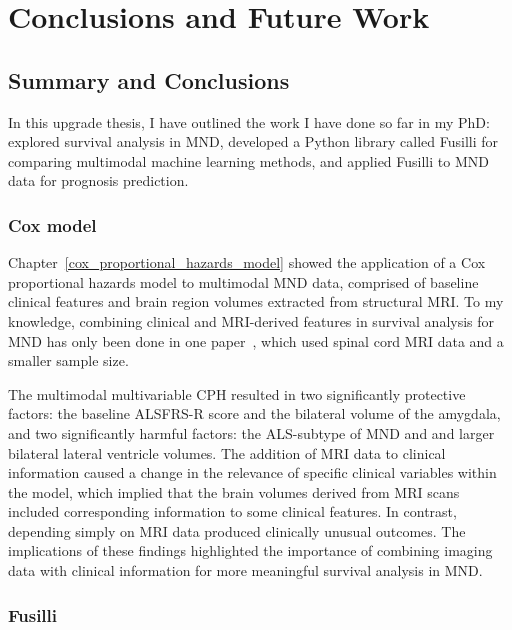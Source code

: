 \chapter{Conclusions and Future Work}
\label{conclusions_and_future_work}

\section{Summary and Conclusions}

In this upgrade thesis, I have outlined the work I have done so far in my PhD: explored survival analysis in MND, developed a Python library called Fusilli for comparing multimodal machine learning methods, and applied Fusilli to MND data for prognosis prediction.

\subsection{Cox model}

Chapter~\ref{cox_proportional_hazards_model} showed the application of a Cox proportional hazards model to multimodal MND data, comprised of baseline clinical features and brain region volumes extracted from structural MRI.
To my knowledge, combining clinical and MRI-derived features in survival analysis for MND has only been done in one paper~\cite{querinSpinalCordMultiparametric2017}, which used spinal cord MRI data and a smaller sample size.

The multimodal multivariable CPH resulted in two significantly protective factors: the baseline ALSFRS-R score and the bilateral volume of the amygdala, and two significantly harmful factors: the ALS-subtype of MND and and larger bilateral lateral ventricle volumes.
The addition of MRI data to clinical information caused a change in the relevance of specific clinical variables within the model, which implied that the brain volumes derived from MRI scans included corresponding information to some clinical features.
In contrast, depending simply on MRI data produced clinically unusual outcomes.
The implications of these findings highlighted the importance of combining imaging data with clinical information for more meaningful survival analysis in MND.

\subsection{Fusilli}


